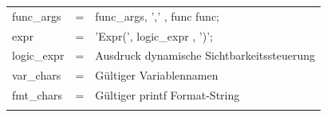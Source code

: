 \begin{longtable}[c]{@{}lll@{}}
\begin{minipage}[t]{0.17\columnwidth}
func\_args
\end{minipage} & \begin{minipage}[t]{0.06\columnwidth}\raggedright
=
\end{minipage} & \begin{minipage}[t]{0.78\columnwidth}\raggedright
func\_args, ',' , func \textbar{} func;
\end{minipage}
\\\noalign{\medskip}
\begin{minipage}[t]{0.17\columnwidth}\raggedright
expr
\end{minipage} & \begin{minipage}[t]{0.06\columnwidth}\raggedright
=
\end{minipage} & \begin{minipage}[t]{0.78\columnwidth}\raggedright
'Expr(', logic\_expr , ')';
\end{minipage}
\\\noalign{\medskip}
\begin{minipage}[t]{0.17\columnwidth}\raggedright
logic\_expr
\end{minipage} & \begin{minipage}[t]{0.06\columnwidth}\raggedright
=
\end{minipage} & \begin{minipage}[t]{0.78\columnwidth}\raggedright
Ausdruck dynamische Sichtbarkeitssteuerung
\end{minipage}
\\\noalign{\medskip}
\begin{minipage}[t]{0.17\columnwidth}\raggedright
var\_chars
\end{minipage} & \begin{minipage}[t]{0.06\columnwidth}\raggedright
=
\end{minipage} & \begin{minipage}[t]{0.78\columnwidth}\raggedright
Gültiger Variablennamen
\end{minipage}
\\\noalign{\medskip}
\begin{minipage}[t]{0.17\columnwidth}\raggedright
fmt\_chars
\end{minipage} & \begin{minipage}[t]{0.06\columnwidth}\raggedright
=
\end{minipage} & \begin{minipage}[t]{0.78\columnwidth}\raggedright
Gültiger printf Format-String
\end{minipage}
\\\noalign{\medskip}

\end{longtable}
